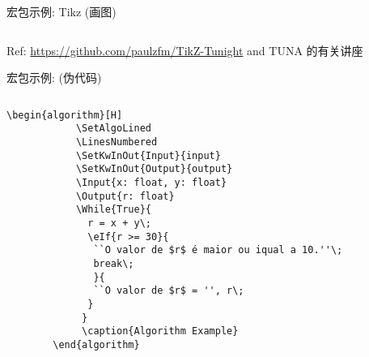 \begin{frame}[fragile]{宏包示例: Tikz (画图)}
\begin{columns}
\begin{column}{.4\textwidth}
        
        \end{column}
        \end{columns}
    Ref: \url{https://github.com/paulzfm/TikZ-Tunight} and TUNA 的有关讲座
    
\end{frame}

\begin{frame}[fragile]{宏包示例:  (伪代码)}
    \begin{columns}
    \begin{column}{.6\textwidth}
        \lstset{language=[LaTeX]TeX}
    \begin{lstlisting}[basicstyle=\ttfamily\tiny]
        \begin{algorithm}[H]
            \SetAlgoLined
            \LinesNumbered
            \SetKwInOut{Input}{input}
            \SetKwInOut{Output}{output}
            \Input{x: float, y: float}
            \Output{r: float}
            \While{True}{
              r = x + y\;
              \eIf{r >= 30}{
               ``O valor de $r$ é maior ou iqual a 10.''\;
               break\;
               }{
               ``O valor de $r$ = '', r\;
              }
             } 
             \caption{Algorithm Example}
        \end{algorithm}
    \end{lstlisting}
    \end{column}
    \begin{column}{.4\textwidth}
        \begin{algorithm}[H]
            \SetAlgoLined
            \LinesNumbered
             \caption{Algorithm Example}
        \end{algorithm}
    \end{column}
    \end{columns}
\end{frame}